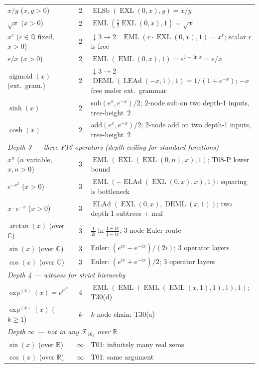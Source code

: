 \documentclass[12pt,a4paper]{article}
\theoremstyle{definition}
\theoremstyle{remark}
\newcommand{\EML}{\operatorname{EML}}
\newcommand{\EXL}{\operatorname{EXL}}
\newcommand{\DEML}{\operatorname{DEML}}
\newcommand{\ELAd}{\operatorname{ELAd}}
\newcommand{\ELSb}{\operatorname{ELSb}}
\newcommand{\LEAd}{\operatorname{LEAd}}
\newcommand{\sigmoid}{\operatorname{sigmoid}}
\newcommand{\F}{\mathcal{F}_{16}}
\newcommand{\R}{\mathbb{R}}
\newcommand{\Q}{\mathbb{Q}}
\newcommand{\C}{\mathbb{C}}
\begin{document}
\begin{longtable}{@{}lcp{7.5cm}@{}}
$x/y$ ($x,y>0$)    & 2 & $\ELSb(\EXL(0,x),y)=x/y$ \\
$\sqrt{x}$ ($x>0$) & 2 & $\EML(\tfrac{1}{2}\EXL(0,x),1)=\sqrt{x}$ \\
$x^r$ ($r\in\Q$ fixed, $x>0$) & 2 &
  \textcolor{collapse}{$\downarrow$3$\to$2}~
  $\EML(r\cdot\EXL(0,x),1)=x^r$; scalar $r$ is free \\
$e/x$ ($x>0$) & 2 & $\EML(\EML(0,x),1)=e^{1-\ln x}=e/x$ \\
$\sigmoid(x)$ (ext.\ gram.) & 2 &
  \textcolor{collapse}{$\downarrow$3$\to$2}~
  $\DEML(\LEAd(-x,1),1)=1/(1+e^{-x})$;
  $-x$ free under ext.\ grammar \\
$\sinh(x)$ & 2 & sub$(e^x,e^{-x})/2$; 2-node sub on two depth-1 inputs,
  tree-height~$2$ \\
$\cosh(x)$ & 2 & add$(e^x,e^{-x})/2$; 2-node add on two depth-1 inputs,
  tree-height~$2$ \\
\midrule
\multicolumn{3}{l}{\textit{Depth 3 — three F16 operators (depth ceiling for standard functions)}} \\
$x^n$ ($n$ variable, $x,n>0$) & 3 &
  $\EML(\EXL(\EXL(0,n),x),1)$; T08-P lower bound \\
$e^{-x^2}$ ($x>0$) & 3 &
  $\EML(-\ELAd(\EXL(0,x),x),1)$; squaring is bottleneck \\
$x\cdot e^{-x}$ ($x>0$) & 3 &
  $\ELAd(\EXL(0,x),\DEML(x,1))$; two depth-1 subtrees + mul \\
$\arctan(x)$ (over $\C$) & 3 &
  $\tfrac{1}{2i}\ln\tfrac{1+ix}{1-ix}$; 3-node Euler route \\
$\sin(x)$ (over $\C$)  & 3 &
  Euler: $(e^{ix}-e^{-ix})/(2i)$; 3 operator layers \\
$\cos(x)$ (over $\C$)  & 3 &
  Euler: $(e^{ix}+e^{-ix})/2$; 3 operator layers \\
\midrule
\multicolumn{3}{l}{\textit{Depth 4 — witness for strict hierarchy}} \\
$\exp^{(4)}(x)=e^{e^{e^{e^x}}}$ & 4 &
  $\EML(\EML(\EML(\EML(x,1),1),1),1)$; T30(d) \\
\midrule
$\exp^{(k)}(x)$ ($k\geq 1$) & $k$ & $k$-node chain; T30(a) \\
\midrule
\multicolumn{3}{l}{\textit{Depth $\infty$ — not in any $\F_k$ over $\R$}} \\
$\sin(x)$ (over $\R$) & $\infty$ & T01: infinitely many real zeros \\
$\cos(x)$ (over $\R$) & $\infty$ & T01: same argument \\
\end{longtable}
\end{document}
